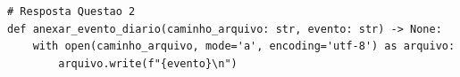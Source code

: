 \ifmostrarGabarito
\begin{verbatim}
# Resposta Questao 2
def anexar_evento_diario(caminho_arquivo: str, evento: str) -> None:
    with open(caminho_arquivo, mode='a', encoding='utf-8') as arquivo:
        arquivo.write(f"{evento}\n")
\end{verbatim}
\fi
